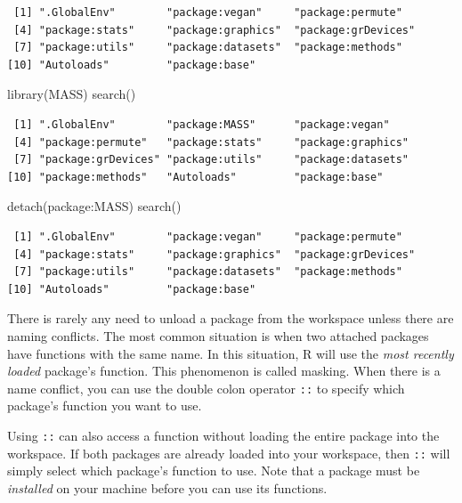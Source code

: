 \documentclass[
  13,
  letterpaper,
]{report}
\newenvironment{Shaded}{\begin{snugshade}}{\end{snugshade}}
\newcommand{\FunctionTok}[1]{\textcolor[rgb]{0.28,0.35,0.67}{#1}}
\newcommand{\NormalTok}[1]{\textcolor[rgb]{0.00,0.23,0.31}{#1}}
\newcommand{\SpecialCharTok}[1]{\textcolor[rgb]{0.37,0.37,0.37}{#1}}
\begin{document}
\begin{verbatim}
 [1] ".GlobalEnv"        "package:vegan"     "package:permute"  
 [4] "package:stats"     "package:graphics"  "package:grDevices"
 [7] "package:utils"     "package:datasets"  "package:methods"  
[10] "Autoloads"         "package:base"     
\end{verbatim}

\begin{Shaded}
\begin{Highlighting}[]
\FunctionTok{library}\NormalTok{(MASS)}
\FunctionTok{search}\NormalTok{()}
\end{Highlighting}
\end{Shaded}

\begin{verbatim}
 [1] ".GlobalEnv"        "package:MASS"      "package:vegan"    
 [4] "package:permute"   "package:stats"     "package:graphics" 
 [7] "package:grDevices" "package:utils"     "package:datasets" 
[10] "package:methods"   "Autoloads"         "package:base"     
\end{verbatim}

\begin{Shaded}
\begin{Highlighting}[]
\FunctionTok{detach}\NormalTok{(package}\SpecialCharTok{:}\NormalTok{MASS)}
\FunctionTok{search}\NormalTok{()}
\end{Highlighting}
\end{Shaded}

\begin{verbatim}
 [1] ".GlobalEnv"        "package:vegan"     "package:permute"  
 [4] "package:stats"     "package:graphics"  "package:grDevices"
 [7] "package:utils"     "package:datasets"  "package:methods"  
[10] "Autoloads"         "package:base"     
\end{verbatim}

There is rarely any need to unload a package from the workspace unless
there are naming conflicts. The most common situation is when two
attached packages have functions with the same name. In this situation,
R will use the \emph{most recently loaded} package's function. This
phenomenon is called masking. When there is a name conflict, you can use
the double colon operator \texttt{::} to specify which package's
function you want to use.

Using \texttt{::} can also access a function without loading the entire
package into the workspace. If both packages are already loaded into
your workspace, then \texttt{::} will simply select which package's
function to use. Note that a package must be \emph{installed} on your
machine before you can use its functions.
\end{document}
